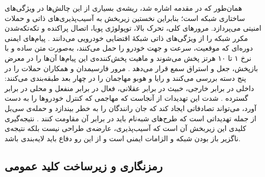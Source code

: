 \documentclass[12pt,a4paper]{article}
\begin{document}
همان‌طور که در مقدمه اشاره شد، ریشه‌ی بسیاری از این چالش‌ها در ویژگی‌های ساختاری شبکه است؛ بنابراین نخستین زیربخش به آسیب‌پذیری‌های ذاتی و حملات امنیتی می‌پردازد. مرور‌های کلی، تحرک بالا، توپولوژی پویا، اتصال پراکنده و تکه‌تکه‌شدن مکرر شبکه را از ویژگی‌های ذاتی شبکهٔ اقتضایی خودرویی می‌دانند \cite{hozouriOverviewVANETVehicular2023, xuInternetVehiclesBig2018}. پیام‌های ایمنی دوره‌ای که موقعیت، سرعت و جهت خودرو را حمل می‌کنند، به‌صورت متن ساده و با نرخ ۱ تا ۱۰ هرتز پخش می‌شوند \cite{al-aniPrivacySafetyImprovement2023} و ماهیت پخش‌کننده‌ی این پیام‌ها آن‌ها را در معرض بازپخش، جعل و استراق سمع قرار می‌دهد \cite{farsimadanReviewSecurityChallenges2025}. مرور فارسیمدان و همکاران حملات را در پنج دسته بررسی می‌کنند \cite{farsimadanReviewSecurityChallenges2025} و رایا و هوبو مهاجمان را در چهار بعد طبقه‌بندی می‌کنند: داخلی در برابر خارجی، خبیث در برابر عقلانی، فعال در برابر منفعل و محلی در برابر گسترده \cite{SecuringVehicularAd}. شدت این تهدیدات از آنجاست که مهاجمی که کنترل خودرو‌ها را به دست آورد، می‌تواند تصادفاتی ایجاد کند که جان رانندگان را به خطر بیندازد \cite{farsimadanReviewSecurityChallenges2025} و حمله‌ی سی‌بل از جمله تهدیداتی است که طرح‌های شبه‌نام باید در برابر آن مقاومت کنند \cite{rahmawatiagustinaSystematicLiteratureReview2025}. نتیجه‌گیری کلیدی این زیربخش آن است که آسیب‌پذیری، عارضه‌ی طراحی نیست بلکه نتیجه‌ی ناگزیر باز بودن شبکه و الزامات ایمنی است و از این رو دفاع باید لایه‌بندی باشد.

\subsection{رمزنگاری و زیرساخت کلید عمومی}
\end{document}
